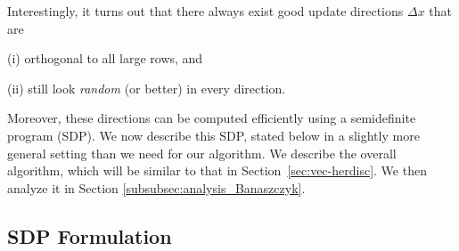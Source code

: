 Interestingly, it turns out that there always exist 
good update directions $\Delta x$ that are

\smallskip 

(i) orthogonal to all large rows, and 

(ii) still look {\em random} (or better) in every direction.

\smallskip 

Moreover, these directions can be computed efficiently using a semidefinite program (SDP). 
 We now describe this SDP, stated below in a slightly more general setting than we need for our algorithm. We describe the overall algorithm, which will be similar to that in Section~\ref{sec:vec-herdisc}. We then analyze it in Section \ref{subsubsec:analysis_Banaszczyk}.
\subsection{SDP Formulation}
\label{subsec:sdp_formulation}



